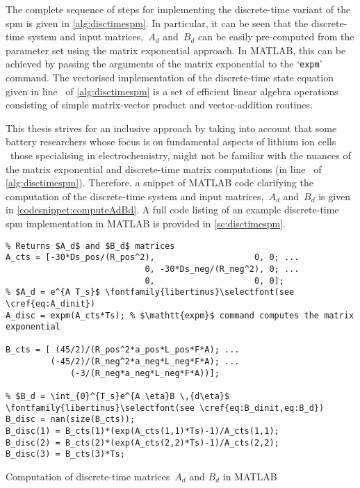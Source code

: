 The complete sequence of steps for implementing the discrete-time variant of the
\gls{spm} is given in \cref{alg:disctimespm}. In particular, it can be seen that
the  discrete-time system  and input  matrices,~$A_d$ and~$B_d$  can be  easily
pre-computed from  the parameter set  using the matrix exponential  approach. In
\textsc{MATLAB}, this  can be achieved  by passing  the arguments of  the matrix
exponential to the  `\verb+expm+' command. The vectorised  implementation of the
discrete-time  state equation  given in  line~\nolink{\ref{algLine:discstateEq}}
of  \cref{alg:disctimespm}  is a  set  of  efficient linear  algebra  operations
consisting of simple matrix-vector product and vector-addition routines.



This thesis strives  for an inclusive approach by taking  into account that some
battery researchers whose  focus is on fundamental aspects of  lithium ion cells
\eg~those  specialising in  electrochemistry,  might not  be  familiar with  the
nuances  of the  matrix exponential  and discrete-time  matrix computations  (in
line~\nolink{\ref{algLine:computeAdBd}}  of \cref{alg:disctimespm}).  Therefore,
a  snippet   of  \textsc{MATLAB}   code  clarifying   the  computation   of  the
discrete-time   system   and   input   matrices,~$A_d$   and~$B_d$   is   given
in   \cref{codesnippet:computeAdBd}.  A   full  code   listing  of   an  example
discrete-time  \gls{spm}  implementation  in   \textsc{MATLAB}  is  provided  in
\cref{sc:disctimespm}.

\begin{listing}[!htbp]
\begin{verbatim}
% Returns $A_d$ and $B_d$ matrices
A_cts = [-30*Ds_pos/(R_pos^2),                    0, 0; ...
                            0, -30*Ds_neg/(R_neg^2), 0; ...
                            0,                    0, 0];
% $A_d = e^{A T_s}$ \fontfamily{libertinus}\selectfont(see \cref{eq:A_dinit})
A_disc = expm(A_cts*Ts); % $\mathtt{expm}$ command computes the matrix exponential

B_cts = [ (45/2)/(R_pos^2*a_pos*L_pos*F*A); ...
         (-45/2)/(R_neg^2*a_neg*L_neg*F*A); ...
             (-3/(R_neg*a_neg*L_neg*F*A))];

% $B_d = \int_{0}^{T_s}e^{A \eta}B \,{d\eta}$ \fontfamily{libertinus}\selectfont(see \cref{eq:B_dinit,eq:B_d})
B_disc = nan(size(B_cts));
B_disc(1) = B_cts(1)*(exp(A_cts(1,1)*Ts)-1)/A_cts(1,1);
B_disc(2) = B_cts(2)*(exp(A_cts(2,2)*Ts)-1)/A_cts(2,2);
B_disc(3) = B_cts(3)*Ts;
\end{verbatim}
\caption{Computation of discrete-time matrices~$A_d$ and $B_d$ in
\textsc{MATLAB}}
\label{codesnippet:computeAdBd}
\end{listing}

